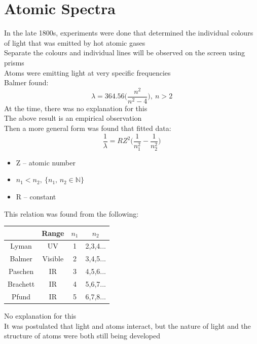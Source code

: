 \documentclass[a4paper, 11pt, fleqn, normalem]{report}
\begin{document}
\section{Atomic Spectra}
In the late 1800s, experiments were done that determined the individual colours of light that was emitted by hot atomic gases \\
Separate the colours and individual lines will be observed on the screen using prisms \\
Atoms were emitting light at very specific frequencies \\
Balmer found:
\begin{equation*}
    \lambda = 364.56\Big(\frac{n^{2}}{n^{2} - 4}\Big),~n > 2
\end{equation*}
At the time, there was no explanation for this \\
The above result is an empirical observation \\
Then a more general form was found that fitted data:
\begin{equation*}
    \frac{1}{\lambda} = RZ^{2}\Big(\frac{1}{n_{1}^{2}} - \frac{1}{n_{2}^{2}}\Big)
\end{equation*}
\begin{itemize}
    \item Z -- atomic number
    \item $n_{1} < n_{2},~\{n_{1},\,n_{2} \in \mathbb{N}\}$
    \item R -- constant
\end{itemize}
This relation was found from the following:
\begin{table}[H]
    \begin{tabular}{c|ccc}
                 & Range   & $n_{1}$ & $n_{2}$  \\
        \hline
        Lyman    & UV      & 1       & 2,3,4... \\
        Balmer   & Visible & 2       & 3,4,5... \\
        Paschen  & IR      & 3       & 4,5,6... \\
        Brachett & IR      & 4       & 5,6,7... \\
        Pfund    & IR      & 5       & 6,7,8...
    \end{tabular}
\end{table}
No explanation for this \\
It was postulated that light and atoms interact, but the nature of light and the structure of atoms were both still being developed
\end{document}

